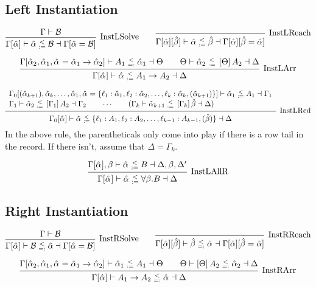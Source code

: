 \documentclass{article}
\newcommand{\B}{\mathcal{B}}
\newcommand{\instLSymbol}{\;\substack{<\\:=}\;}
\newcommand{\instRSymbol}{\;\substack{<\\=:}\;}
\newcommand{\ev}{\hat}
\newcommand{\spc}{\qquad}
\newcommand{\apply}[1]{\left[#1\right]}
\newcommand{\eva}[1][]{\ev \alpha_{#1}}
\newcommand{\evb}{\ev \beta}
\newcommand{\instL}[4]{#1 \vdash #2 \instLSymbol #3 \dashv #4}
\newcommand{\instR}[4]{#1 \vdash #2 \instRSymbol #3 \dashv #4}
\newcommand{\deduct}[3][]
{
  \begin{prooftree}
    \hypo{#2}
    \infer1[\text{#1}]{#3}
  \end{prooftree}
}
\begin{document}
\subsection{Left Instantiation}

\[
  \deduct[InstLSolve]
  {\Gamma \vdash \B}
  {\instL{\Gamma[\ev\alpha]}{\ev \alpha}{\B}{\Gamma[\ev\alpha = \B]}}
  \spc
  \deduct[InstLReach]
  {}
  {\instL{\Gamma[\ev\alpha][\ev\beta]}{\ev \alpha}{\ev
      \beta}{\Gamma[\ev\alpha][\ev\beta = \ev\alpha]}}
\]

\[
  \deduct[InstLArr] {\instR{\Gamma[\eva[2], \eva[1], \eva = \eva[1] \to
      \eva[2]]}{A_1}{\eva[1]}{\Theta} \spc \instL{\Theta}{\eva[2]}{\apply \Theta
      A_2}{\Delta} } {\instL{\Gamma[\eva]}{\eva}{A_1 \to A_2}{\Delta}}
\]

\[
  \deduct[InstLRcd]
  {
    \begin{array}{l}
     \instL{\Gamma_0[(\eva[k+1]), \eva[k], \dots, \eva[1], \eva=\{\ell_1 : \eva[1],
      \ell_2 : \eva[2], \dots, \ell_k : \eva[k], (\eva[k+1])\}]}{\eva[1]}{A_1}{\Gamma_1} \\
    \instL{\Gamma_1}{\eva[2]}{\apply{\Gamma_1} A_2}{\Gamma_2} \spc \cdots \spc
     (\instL{\Gamma_k}{\eva[k+1]}{\apply{\Gamma_k}\evb}{\Delta})
  \end{array}
  }
  {\instL{\Gamma_0[\eva]}{\eva}{\{\ell_1:A_1, \ell_2 : A_2, \dots, \ell_{k-1} : A_{k-1}, (\evb)\}}{\Delta}}
\]
In the above rule, the parentheticals only come into play if there is a row tail
in the record. If there isn't, assume that \(\Delta = \Gamma_k\).

\[
  \deduct[InstLAllR]
  { \instL{\Gamma[\eva], \beta}{\eva}{B}{\Delta, \beta, \Delta'} }
  { \instL{\Gamma[\eva]}{\eva}{\forall \beta. B}{\Delta} }
\]

\subsection{Right Instantiation}

\[
  \deduct[InstRSolve]
  {\Gamma \vdash \B}
  {\instR{\Gamma[\ev\alpha]}{\B}{\ev \alpha}{\Gamma[\ev\alpha = \B]}}
  \spc
  \deduct[InstRReach]
  {}
  {\instR{\Gamma[\ev\alpha][\ev\beta]}{\ev
      \beta}{\eva}{\Gamma[\ev\alpha][\ev\beta = \ev\alpha]}}
\]

\[
  \deduct[InstRArr] {\instL{\Gamma[\eva[2], \eva[1], \eva = \eva[1] \to
      \eva[2]]}{\eva[1]}{A_1}{\Theta} \spc \instR{\Theta}{\apply \Theta
      A_2}{\eva[2]}{\Delta} } {\instR{\Gamma[\eva]}{A_1 \to A_2}{\eva}{\Delta}}
\]
\end{document}

